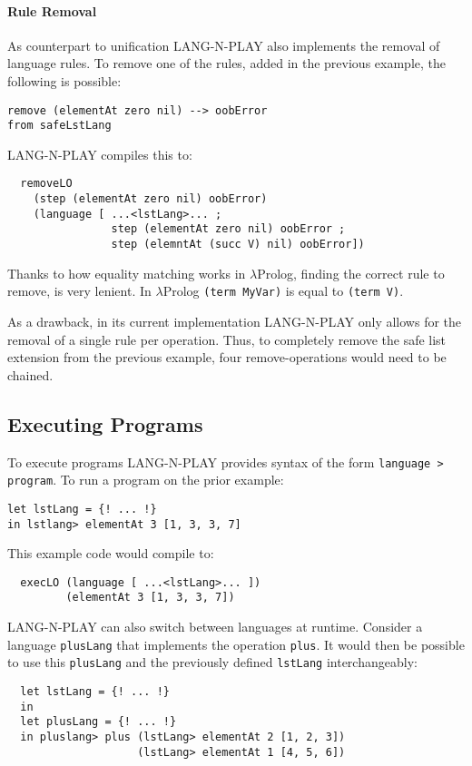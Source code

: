 \paragraph{Rule Removal}
As counterpart to unification LANG-N-PLAY also implements the removal of language rules. To remove one of the rules, added in the previous example, the following is possible:

\begin{lstlisting}
remove (elementAt zero nil) --> oobError
from safeLstLang 
\end{lstlisting}

LANG-N-PLAY compiles this to:

\begin{lstlisting}
  removeLO
    (step (elementAt zero nil) oobError)
    (language [ ...<lstLang>... ;
                step (elementAt zero nil) oobError ;
                step (elemntAt (succ V) nil) oobError])
\end{lstlisting}

Thanks to how equality matching works in $\lambda$Prolog, finding the correct rule to remove, is very lenient. In $\lambda$Prolog \lstinline|(term MyVar)| is equal to \lstinline|(term V)|.

As a drawback, in its current implementation LANG-N-PLAY only allows for the removal of a single rule per operation. Thus, to completely remove the safe list extension from the previous example, four remove-operations would need to be chained.


\subsection{Executing Programs}
To execute programs LANG-N-PLAY provides syntax of the form \lstinline|language > program|. To run a program on the prior example:

\begin{lstlisting}
let lstLang = {! ... !}
in lstlang> elementAt 3 [1, 3, 3, 7]
\end{lstlisting}

This example code would compile to:

\begin{lstlisting}
  execLO (language [ ...<lstLang>... ]) 
         (elementAt 3 [1, 3, 3, 7])
\end{lstlisting}

LANG-N-PLAY can also switch between languages at runtime. Consider a language \lstinline|plusLang| that implements the operation \lstinline|plus|. It would then be possible to use this \lstinline|plusLang| and the previously defined \lstinline|lstLang| interchangeably:

\begin{lstlisting}
  let lstLang = {! ... !}
  in 
  let plusLang = {! ... !}
  in pluslang> plus (lstLang> elementAt 2 [1, 2, 3]) 
                    (lstLang> elementAt 1 [4, 5, 6])
\end{lstlisting}